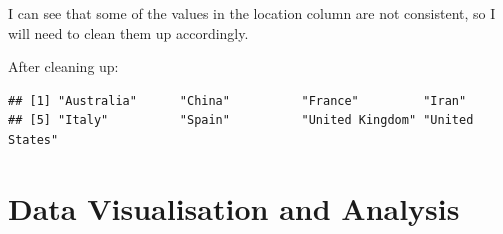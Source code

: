 \documentclass[
]{article}
\newenvironment{Shaded}{\begin{snugshade}}{\end{snugshade}}
\newcommand{\FunctionTok}[1]{\textcolor[rgb]{0.13,0.29,0.53}{\textbf{#1}}}
\newcommand{\NormalTok}[1]{#1}
\newcommand{\OtherTok}[1]{\textcolor[rgb]{0.56,0.35,0.01}{#1}}
\newcommand{\SpecialCharTok}[1]{\textcolor[rgb]{0.81,0.36,0.00}{\textbf{#1}}}
\newcommand{\StringTok}[1]{\textcolor[rgb]{0.31,0.60,0.02}{#1}}
\begin{document}
I can see that some of the values in the location column are not
consistent, so I will need to clean them up accordingly.

\begin{Shaded}
\end{Shaded}

After cleaning up:

\begin{Shaded}
\end{Shaded}

\begin{verbatim}
## [1] "Australia"      "China"          "France"         "Iran"          
## [5] "Italy"          "Spain"          "United Kingdom" "United States"
\end{verbatim}

\vspace {2 cm}

\section{Data Visualisation and
Analysis}\label{data-visualisation-and-analysis}
\end{document}
